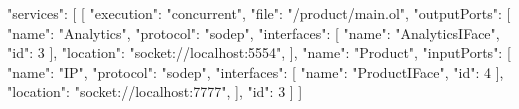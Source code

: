 \begin{jsonlisting}[][caption={Services and ports from Jolie represented in JSON}, label={lst:appen_joliejson_svcs_ports}]
{
  "services": [
    [
      {
        "execution": "concurrent",
        "file": "/product/main.ol",
        "outputPorts": [
          {
            "name": "Analytics",
            "protocol": "sodep",
            "interfaces": [
              {
                "name": "AnalyticsIFace",
                "id": 3
              }
            ],
            "location": "socket://localhost:5554",
          }
        ],
        "name": "Product",
        "inputPorts": [
          {
            "name": "IP",
            "protocol": "sodep",
            "interfaces": [
              {
                "name": "ProductIFace",
                "id": 4
              }
            ],
            "location": "socket://localhost:7777",
          }
        ],
        "id": 3
      }
    ]
  ]
}
\end{jsonlisting}
